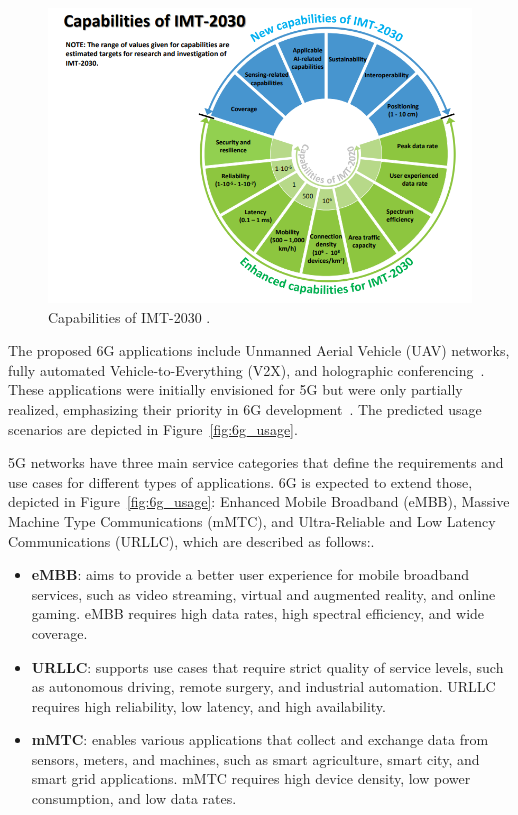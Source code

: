 \begin{figure}[H]
    \centering
    \includegraphics[width=0.8\linewidth]{figures/capabilities 6g}
    \caption[Capabilities of IMT-2030]{Capabilities of IMT-2030 \cite{ITU_2160-0}.}
    \label{fig:6g_capab}
\end{figure}

The proposed 6G applications include Unmanned Aerial Vehicle (UAV) networks, fully automated Vehicle-to-Everything (V2X), and holographic conferencing~\cite{6G_ITU}.
These applications were initially envisioned for 5G but were only partially realized, emphasizing their priority in 6G development~\cite{6G_ITU}.
The predicted usage scenarios are depicted in Figure~\ref{fig:6g_usage}.

5G networks have three main service categories that define the requirements and use cases for different types of applications.
6G is expected to extend those, depicted in Figure~\ref{fig:6g_usage}: Enhanced Mobile Broadband (eMBB), Massive Machine Type Communications (mMTC), and Ultra-Reliable and Low Latency Communications (URLLC), which are described as follows:.
\begin{itemize}
    \item \textbf{eMBB}: aims to provide a better user experience for mobile broadband services, such as video streaming, virtual and augmented reality, and online gaming.
    eMBB requires high data rates, high spectral efficiency, and wide coverage.
    \item \textbf{URLLC}: supports use cases that require strict quality of service levels, such as autonomous driving, remote surgery, and industrial automation.
    URLLC requires high reliability, low latency, and high availability.
    \item \textbf{mMTC}: enables various applications that collect and exchange data from sensors, meters, and machines, such as smart agriculture, smart city, and smart grid applications.
    mMTC requires high device density, low power consumption, and low data rates.
\end{itemize}

